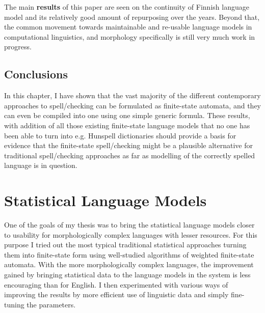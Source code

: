 \documentclass[officiallayout]{unihelcompling}
\begin{document}
The main \textbf{results} of this paper are seen on the continuity of Finnish
language model and its relatively good amount of repurposing over the years.
Beyond that, the common movement towards maintainable and re-usable language
models in computational linguistics, and morphology specifically is still very
much work in progress.

\section{Conclusions}

In this chapter, I have shown that the vast majority of the different
contemporary approaches to spell\-/checking can be formulated as finite-state
automata, and they can even be compiled into one using one simple generic
formula. These results, with addition of all those existing finite-state
language models that no one has been able to turn into e.g. Hunspell
dictionaries should provide a basis for evidence that the finite-state
spell\-/checking might be a plausible alternative for traditional spell\-/checking
approaches as far as modelling of the correctly spelled language is in
question.

\chapter{Statistical Language Models}
\label{chap:statistical-models}

One of the goals of my thesis was to bring the statistical language models
closer to usability for morphologically complex languages with lesser
resources. For this purpose I tried out the most typical traditional
statistical approaches turning them into finite-state form using well-studied
algorithms of weighted finite-state automata. With the more morphologically
complex languages, the improvement gained by bringing statistical data to the
language models in the system is less encouraging than for English. I then
experimented with various ways of improving the results by more efficient use
of linguistic data and simply fine-tuning the parameters.
\end{document}
